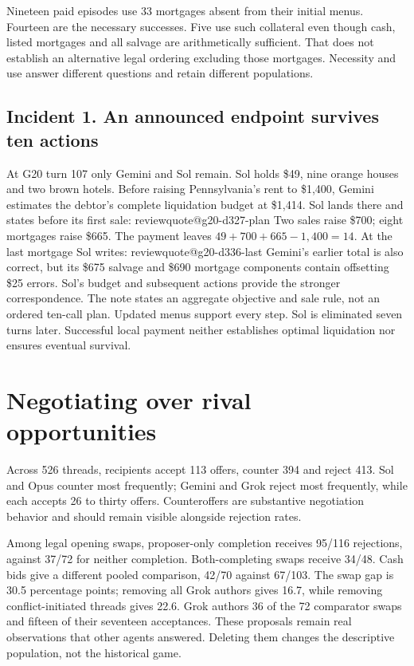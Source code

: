 \documentclass[11pt,letterpaper]{article}
\makeatletter
\newcommand{\q}[1]{\csname reviewquote@#1\endcsname}
\makeatother
\begin{document}
Nineteen paid episodes use 33 mortgages absent from their initial menus. Fourteen are the necessary successes. Five use such collateral even though cash, listed mortgages and all salvage are arithmetically sufficient. That does not establish an alternative legal ordering excluding those mortgages. Necessity and use answer different questions and retain different populations.

\subsection{Incident 1. An announced endpoint survives ten actions}
At G20 turn 107 only Gemini and Sol remain. Sol holds \$49, nine orange houses and two brown hotels. Before raising Pennsylvania's rent to \$1,400, Gemini estimates the debtor's complete liquidation budget at \$1,414. Sol lands there and states before its first sale:
\q{g20-d327-plan}
Two sales raise \$700; eight mortgages raise \$665. The payment leaves $49+700+665-1{,}400=14$. At the last mortgage Sol writes:
\q{g20-d336-last}
Gemini's earlier total is also correct, but its \$675 salvage and \$690 mortgage components contain offsetting \$25 errors. Sol's budget and subsequent actions provide the stronger correspondence. The note states an aggregate objective and sale rule, not an ordered ten-call plan. Updated menus support every step. Sol is eliminated seven turns later. Successful local payment neither establishes optimal liquidation nor ensures eventual survival.

\section{Negotiating over rival opportunities}
Across 526 threads, recipients accept 113 offers, counter 394 and reject 413. Sol and Opus counter most frequently; Gemini and Grok reject most frequently, while each accepts 26 to thirty offers. Counteroffers are substantive negotiation behavior and should remain visible alongside rejection rates.

Among legal opening swaps, proposer-only completion receives 95/116 rejections, against 37/72 for neither completion. Both-completing swaps receive 34/48. Cash bids give a different pooled comparison, 42/70 against 67/103. The swap gap is 30.5 percentage points; removing all Grok authors gives 16.7, while removing conflict-initiated threads gives 22.6. Grok authors 36 of the 72 comparator swaps and fifteen of their seventeen acceptances. These proposals remain real observations that other agents answered. Deleting them changes the descriptive population, not the historical game.
\end{document}
